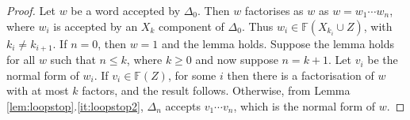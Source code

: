 \documentclass[a4paper,12pt]{article}
\renewcommand{\a}{\alpha }
\renewcommand{\b}{\beta }
\newcommand{\g}{\gamma }
\newcommand{\D}{\Delta }
\renewcommand{\d}{\delta }
\renewcommand{\L}{\Lambda }
\renewcommand{\S}{\Sigma }
\newcommand{\cA}{{\cal{A}}}
\newcommand{\cF}{{\cal{F}}}
\newtheorem{theorem}{Theorem}[section]
\numberwithin{equation}{section}
\numberwithin{figure}{section}
\newcommand{\FF}{\ensuremath{\mathbb{F}}}
\renewcommand{\cF}{\mathcal{F}}
\begin{document}
\begin{proof}
Let $w$ be a word accepted by $\D_0$. Then $w$ factorises as  $w$
as $w=w_1\cdots w_n$, where $w_i$ is accepted by an $X_k$
component of $\D_0$. Thus $w_i\in \FF(X_{k_i}\cup Z)$, with $k_i\neq
k_{i+1}$. If $n=0$, then $w=1$ and the lemma holds. Suppose the
lemma holds for all $w$ such that $n\le k$, where $k\ge 0$ and now
suppose $n=k+1$. Let $v_i$ be the normal form of $w_i$. If $v_i\in
\FF(Z)$, for some $i$ then there is a factorisation of $w$ with at
most $k$ factors, and the result follows. Otherwise, from Lemma
\ref{lem:loopstop}.\ref{it:loopstop2},  $\D_n$ accepts $v_1\cdots
v_n$, which is the normal form of $w$.

\end{proof}

\end{document}
